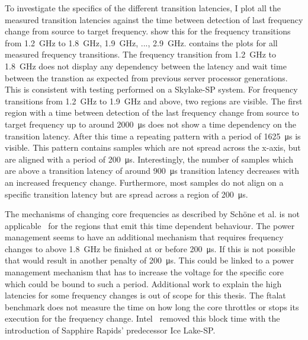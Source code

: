 To investigate the specifics of the different transition latencies, I plot all the measured transition latencies against the time between detection of last frequency change from source to target frequency.
 show this for the frequency transitions from \SI{1.2}{\GHz} to \SI{1.8}{\GHz}, \SI{1.9}{\GHz}, ..., \SI{2.9}{\GHz}.
 contains the plots for all measured frequency transitions.
The frequency transition from \SI{1.2}{\GHz} to \SI{1.8}{\GHz} does not display any dependency between the latency and wait time between the transtion as expected from previous server processor generations.
This is consistent with testing performed on a Skylake-SP system.
For frequency transitions from \SI{1.2}{\GHz} to \SI{1.9}{\GHz} and above, two regions are visible.
The first region with a time between detection of the last frequency change from source to target frequency up to around \SI{2000}{\us} does not show a time dependency on the transition latency.
After this time a repeating pattern with a period of \SI{1625}{\us} is visible.
This pattern contains samples which are not spread across the x-axis, but are aligned with a period of \SI{200}{\us}.
Interestingly, the number of samples which are above a transition latency of around \SI{900}{\us} transition latency decreases with an increased frequency change.
Furthermore, most samples do not align on a specific transition latency but are spread across a region of \SI{200}{\us}.

The mechanisms of changing core frequencies as described by Schöne et al. is not applicable~\cite{Schoene_2019_SKL} for the regions that emit this time dependent behaviour.
The power management seems to have an additional mechanism that requires frequency changes to above \SI{1.8}{\GHz} be finished at or before \SI{200}{\us}.
If this is not possible that would result in another penalty of \SI{200}{\us}.
This could be linked to a power management mechanism that has to increase the voltage for the specific core which could be bound to such a period.
Additional work to explain the high latencies for some frequency changes is out of scope for this thesis.
The ftalat benchmark does not measure the time on how long the core throttles or stops its execution for the frequency change.
Intel~\cite{Intel_2020_IceLake_SP} removed this block time with the introduction of Sapphire Rapids' predecessor Ice Lake-SP.

